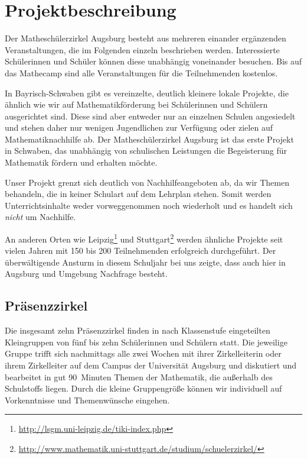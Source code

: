\documentclass[12pt]{zettel}
\begin{document}
\section{Projektbeschreibung}

Der Matheschülerzirkel Augsburg besteht aus mehreren einander ergänzenden Veranstaltungen, die im
Folgenden einzeln beschrieben werden. Interessierte Schülerinnen und Schüler
können diese unabhängig voneinander besuchen. Bis auf das Mathecamp sind alle
Veranstaltungen für die Teilnehmenden kostenlos.

In Bayrisch-Schwaben gibt es vereinzelte, deutlich kleinere lokale
Projekte, die ähnlich wie wir auf Mathematikförderung bei Schülerinnen und
Schülern ausgerichtet sind. Diese sind aber entweder nur an einzelnen Schulen
angesiedelt und stehen daher nur wenigen Jugendlichen zur Verfügung oder zielen
auf Mathematiknachhilfe ab. Der Matheschülerzirkel Augsburg ist das erste
Projekt in Schwaben, das unabhängig von schulischen Leistungen die
Begeisterung für Mathematik fördern und erhalten möchte.

Unser Projekt grenzt sich deutlich von Nachhilfeangeboten ab, da wir Themen behandeln, die in keiner Schulart auf dem Lehrplan stehen. Somit werden Unterrichtsinhalte weder vorweggenommen noch wiederholt und es handelt sich \emph{nicht} um Nachhilfe.

An anderen Orten wie Leipzig\footnote{\href{http://lsgm.uni-leipzig.de/tiki-index.php}{\textsf{http:/\!/lsgm.uni-leipzig.de/tiki-index.php}}} und Stuttgart\footnote{\href{http://www.mathematik.uni-stuttgart.de/studium/schuelerzirkel/}{\textsf{http:/\!/www.mathematik.uni-stuttgart.de/studium/schuelerzirkel/}}} werden ähnliche Projekte seit
vielen Jahren mit 150 bis 200 Teilnehmenden erfolgreich durchgeführt. Der überwältigende Ansturm in
diesem Schuljahr bei uns zeigte, dass auch hier in Augsburg und Umgebung Nachfrage
besteht.

\subsection{Präsenzzirkel}

Die insgesamt zehn Präsenzzirkel finden in nach Klassenstufe eingeteilten
Kleingruppen von fünf bis zehn Schülerinnen und Schülern statt.
Die jeweilige Gruppe trifft sich nachmittags alle zwei Wochen mit ihrer Zirkelleiterin oder ihrem
Zirkelleiter auf dem Campus der Universität Augsburg und diskutiert und
bearbeitet in gut 90~Minuten Themen der Mathematik, die außerhalb des
Schulstoffs liegen. Durch die kleine Gruppengröße können wir individuell auf
Vorkenntnisse und Themenwünsche eingehen.
\end{document}
